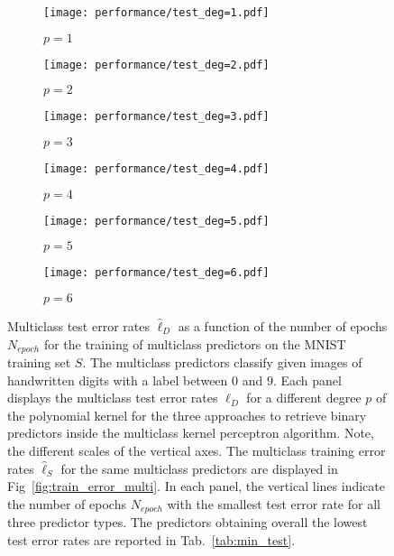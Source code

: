 \begin{figure}[h!]
    \begin{subfigure}[t]{0.49\textwidth}
        \centering
        \texttt{[image: performance/test\_deg=1.pdf]} 
        \caption{$p = 1$}
    \end{subfigure}
    \hfill
    \begin{subfigure}[t]{0.49\textwidth}
        \centering
        \texttt{[image: performance/test\_deg=2.pdf]} 
        \caption{$p = 2$}
    \end{subfigure}
    \par\bigskip
        \begin{subfigure}[t]{0.49\textwidth}
        \centering
        \texttt{[image: performance/test\_deg=3.pdf]} 
        \caption{$p = 3$}
    \end{subfigure}
    \hfill
    \begin{subfigure}[t]{0.49\textwidth}
        \centering
        \texttt{[image: performance/test\_deg=4.pdf]} 
        \caption{$p = 4$}
    \end{subfigure}
    \par\bigskip
        \begin{subfigure}[t]{0.49\textwidth}
        \centering
        \texttt{[image: performance/test\_deg=5.pdf]} 
        \caption{$p = 5$}
    \end{subfigure}
    \hfill
    \begin{subfigure}[t]{0.49\textwidth}
        \centering
        \texttt{[image: performance/test\_deg=6.pdf]} 
        \caption{$p = 6$}
    \end{subfigure}
    \caption{Multiclass test error rates $\hat{\ell}_{D}$ as a function of the number of epochs $N_{epoch}$ for the training of multiclass predictors on the MNIST training set $S$. The multiclass predictors classify given images of handwritten digits with a label between $0$ and $9$. Each panel displays the multiclass test error rates $\hat{\ell}_{D}$ for a different degree $p$ of the polynomial kernel for the three approaches to retrieve binary predictors inside the multiclass kernel perceptron algorithm. Note, the different scales of the vertical axes. The multiclass training error rates $\hat{\ell}_{S}$ for the same multiclass predictors are displayed in Fig~\ref{fig:train_error_multi}. In each panel, the vertical lines indicate the number of epochs $N_{epoch}$ with the smallest test error rate for all three predictor types. The predictors obtaining overall the lowest test error rates are reported in Tab.~\ref{tab:min_test}.}
    \label{fig:test_error_multi}
\end{figure}

